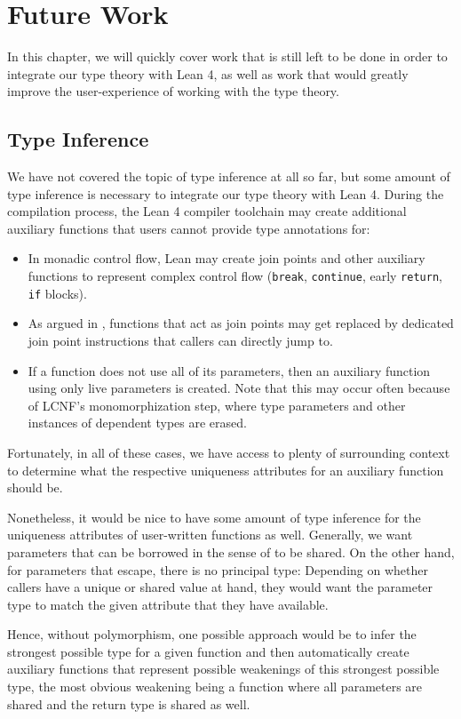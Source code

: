 \chapter{Future Work}\label{sec:futurework}
In this chapter, we will quickly cover work that is still left to be done in order to integrate our type theory with Lean 4, as well as work that would greatly improve the user-experience of working with the type theory.

\section{Type Inference}\label{sec:inference}
We have not covered the topic of type inference at all so far, but some amount of type inference is necessary to integrate our type theory with Lean 4. During the compilation process, the Lean 4 compiler toolchain may create additional auxiliary functions that users cannot provide type annotations for: 
\begin{itemize}
	\item In monadic control flow, Lean may create join points and other auxiliary functions to represent complex control flow (\lstinline|break|, \lstinline|continue|, early \lstinline|return|, \lstinline|if| blocks).
	\item As argued in , functions that act as join points may get replaced by dedicated join point instructions that callers can directly jump to.
	\item If a function does not use all of its parameters, then an auxiliary function using only live parameters is created. Note that this may occur often because of LCNF's monomorphization step, where type parameters and other instances of dependent types are erased.
\end{itemize}
Fortunately, in all of these cases, we have access to plenty of surrounding context to determine what the respective uniqueness attributes for an auxiliary function should be.

Nonetheless, it would be nice to have some amount of type inference for the uniqueness attributes of user-written functions as well. Generally, we want parameters that can be borrowed in the sense of  to be shared. On the other hand, for parameters that escape, there is no principal type: Depending on whether callers have a unique or shared value at hand, they would want the parameter type to match the given attribute that they have available.

Hence, without polymorphism, one possible approach would be to infer the strongest possible type for a given function and then automatically create auxiliary functions that represent possible weakenings of this strongest possible type, the most obvious weakening being a function where all parameters are shared and the return type is shared as well.

